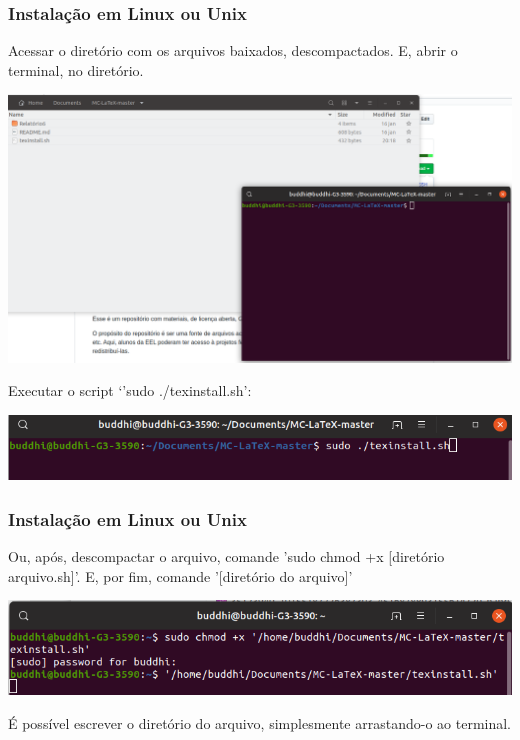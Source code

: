 \documentclass{beamer}
\begin{document}
\begin{frame}
  \frametitle{Instalação em Linux ou Unix}
  Acessar o diretório com os arquivos baixados, descompactados. E,
  abrir o terminal, no diretório.

  \begin{center}
  \includegraphics[scale=0.15]{../Imagens/MC4.png}
  \end{center}

  \pause

  Executar o script `'sudo ./texinstall.sh':

  \begin{center}
  \includegraphics[scale=0.4]{../Imagens/MC5.png}
  \end{center}

\end{frame}


\begin{frame}
  \frametitle{Instalação em Linux ou Unix}

  Ou, após, descompactar o arquivo, comande 'sudo chmod +x [diretório
  arquivo.sh]'. E, por fim, comande '[diretório do arquivo]'

  \begin{center}
    \includegraphics[scale=0.4]{../Imagens/MC6.png}
  \end{center}

  É possível escrever o diretório do arquivo, simplesmente
  arrastando-o ao terminal.

\end{frame}
\end{document}

